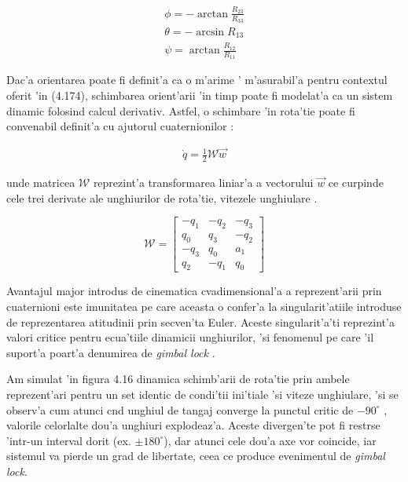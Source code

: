 \documentclass[12pt,a4paper,twoside]{report}
\begin{document}
\begin{gather}
    \phi = -\arctan{\frac{R_{23}}{R_{33}}} \\ 
    \theta = - \arcsin{R_{13}} \\ 
    \psi = \arctan{\frac{R_{12}}{R_{11}}}
\end{gather}

Dac'a orientarea poate fi definit'a ca o m'arime ' m'asurabil'a pentru contextul oferit 'in (4.174), schimbarea orient'arii 'in timp poate fi modelat'a ca un sistem dinamic folosind calcul derivativ. Astfel, o schimbare 'in rota'tie poate fi convenabil definit'a cu ajutorul cuaternionilor \cite{article3}:

\begin{gather}
    \dot q = \frac{1}{2} \mathcal{W} \vec w
\end{gather}

unde matricea $\mathcal{W}$ reprezint'a transformarea liniar'a a vectorului $\vec w$ ce curpinde cele trei derivate ale unghiurilor de rota'tie, vitezele unghiulare \cite{article3}. 

\begin{equation}
    \mathcal{W} = \begin{bmatrix}
    -q_1 & -q_2 & -q_3 \\ q_0 & q_3 & -q_2 \\ -q_3 & q_0 & a_1 \\ q_2 & -q_1 & q_0
    \end{bmatrix}
\end{equation}

Avantajul major introdus de cinematica cvadimensional'a a reprezent'arii prin cuaternioni este imunitatea pe care aceasta o confer'a la singularit'atiile introduse de reprezentarea atitudinii prin secven'ta Euler. Aceste singularit'a'ti reprezint'a valori critice pentru ecua'tiile dinamicii unghiurilor, 'si fenomenul pe care 'il suport'a poart'a denumirea de \textit{gimbal lock} \cite{article3}.

\vspace{5px}

Am simulat \cite{udemyQuats} 'in figura 4.16 dinamica schimb'arii de rota'tie prin ambele reprezent'ari pentru un set identic de condi'tii ini'tiale 'si viteze unghiulare, 'si se observ'a cum atunci c\ia nd unghiul de tangaj converge la punctul critic de $-90^{\circ}$ \cite{article3}, valorile celorlalte dou'a unghiuri explodeaz'a. Aceste divergen'te pot fi restr\ia se 'intr-un interval dorit (ex. $\pm 180^{\circ}$), dar atunci cele dou'a axe vor coincide, iar sistemul va pierde un grad de libertate, ceea ce produce evenimentul de \textit{gimbal lock}.
\end{document}
